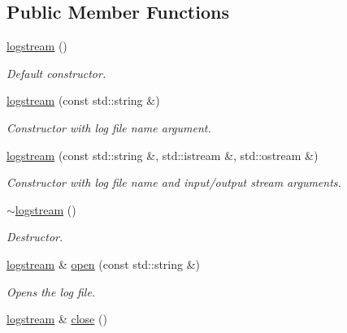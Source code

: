 \subsection*{Public Member Functions}
\begin{DoxyCompactItemize}
\item 
\hypertarget{a00330_a59f934ba427fe75d4c8a1f4501f5101a}{}\hyperlink{a00330_a59f934ba427fe75d4c8a1f4501f5101a}{logstream} ()\label{a00330_a59f934ba427fe75d4c8a1f4501f5101a}

\begin{DoxyCompactList}\small\item\em Default constructor. \end{DoxyCompactList}\item 
\hypertarget{a00330_aa61e2bcd90b857f4399cfd80b7118475}{}\hyperlink{a00330_aa61e2bcd90b857f4399cfd80b7118475}{logstream} (const std\+::string \&)\label{a00330_aa61e2bcd90b857f4399cfd80b7118475}

\begin{DoxyCompactList}\small\item\em Constructor with log file name argument. \end{DoxyCompactList}\item 
\hyperlink{a00330_ac6caf435a7fc57e53d45c928680037d8}{logstream} (const std\+::string \&, std\+::istream \&, std\+::ostream \&)
\begin{DoxyCompactList}\small\item\em Constructor with log file name and input/output stream arguments. \end{DoxyCompactList}\item 
\hypertarget{a00330_a1892de99cb47b8b1eb893f2216e8525b}{}\hyperlink{a00330_a1892de99cb47b8b1eb893f2216e8525b}{$\sim$logstream} ()\label{a00330_a1892de99cb47b8b1eb893f2216e8525b}

\begin{DoxyCompactList}\small\item\em Destructor. \end{DoxyCompactList}\item 
\hypertarget{a00330_ae4584dbcbedac153a276ff21098d0793}{}\hyperlink{a00330}{logstream} \& \hyperlink{a00330_ae4584dbcbedac153a276ff21098d0793}{open} (const std\+::string \&)\label{a00330_ae4584dbcbedac153a276ff21098d0793}

\begin{DoxyCompactList}\small\item\em Opens the log file. \end{DoxyCompactList}\item 
\hypertarget{a00330_abade997a668239429b3b8421ce176b04}{}\hyperlink{a00330}{logstream} \& \hyperlink{a00330_abade997a668239429b3b8421ce176b04}{close} ()\label{a00330_abade997a668239429b3b8421ce176b04}


\end{DoxyCompactItemize}
